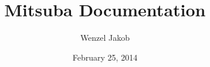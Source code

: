 \begin{center}
		\title{Mitsuba Documentation}
		\author{Wenzel Jakob}
		\date{February 25, 2014}
		\maketitle
\end{center}